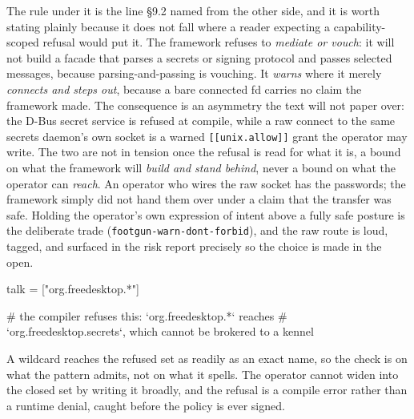 The rule under it is the line §9.2 named from the other side, and it is
worth stating plainly because it does not fall where a reader expecting
a capability-scoped refusal would put it. The framework refuses to
\emph{mediate or vouch}: it will not build a facade that parses a
secrets or signing protocol and passes selected messages, because
parsing-and-passing is vouching. It \emph{warns} where it merely
\emph{connects and steps out}, because a bare connected fd carries no
claim the framework made. The consequence is an asymmetry the text will
not paper over: the D-Bus secret service is refused at compile, while a
raw connect to the same secrets daemon's own socket is a warned
\texttt{{[}{[}unix.allow{]}{]}} grant the operator may write. The two
are not in tension once the refusal is read for what it is, a bound on
what the framework will \emph{build and stand behind}, never a bound on
what the operator can \emph{reach}. An operator who wires the raw socket
has the passwords; the framework simply did not hand them over under a
claim that the transfer was safe. Holding the operator's own expression
of intent above a fully safe posture is the deliberate trade
(\texttt{footgun-warn-dont-forbid}), and the raw route is loud, tagged,
and surfaced in the risk report precisely so the choice is made in the
open.

\begin{kennelcode}
talk = ["org.freedesktop.*"]

# the compiler refuses this: `org.freedesktop.*` reaches
# `org.freedesktop.secrets`, which cannot be brokered to a kennel
\end{kennelcode}

A wildcard reaches the refused set as readily as an exact name, so the
check is on what the pattern admits, not on what it spells. The operator
cannot widen into the closed set by writing it broadly, and the refusal
is a compile error rather than a runtime denial, caught before the
policy is ever signed.
